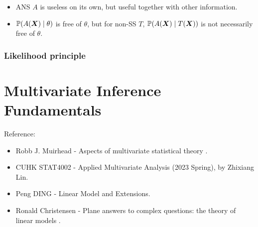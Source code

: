 \documentclass[10pt,a4paper]{book}
\begin{document}
\begin{remark}\label{rmk:SS-MSS-ANS-CS}
	\begin{itemize}
		\item ANS $A$ is useless on its own, but useful together with other information. 
		\item $\mathbb P(A({\boldsymbol X})\mid \theta)$ is free of $\theta$, but for non-SS $T$, $\mathbb P(A({\boldsymbol X})\mid T({\boldsymbol X}))$ is not necessarily free of $\theta$. 
	\end{itemize}
\end{remark}

\subsection{Likelihood principle}\label{sec:prin-data-reduce-lik}




\chapter{Multivariate Inference Fundamentals}\label{chap:multi}
Reference: 
\begin{itemize}
	\item Robb J. Muirhead - Aspects of multivariate statistical theory \cite{muirhead1982aspects}.
	\item CUHK STAT4002 - Applied Multivariate Analysis (2023 Spring), by Zhixiang Lin.
	\item Peng DING - Linear Model and Extensions.
	\item Ronald Christensen - Plane answers to
	complex questions: the theory of linear models \cite{christensen2002plane}.
\end{itemize}
\end{document}
